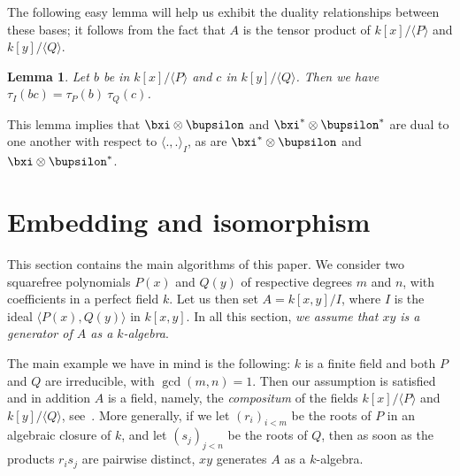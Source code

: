 \documentclass{sig-alternate}
\newcounter{algo}
\newcommand{\ang}[1]{\langle#1\rangle}
\newtheorem{Lemma}{Lemma}
\begin{document}
The following easy lemma will help us exhibit the duality
relationships between these bases; it follows from the fact that $A$
is the tensor product of $k[x]/\ang{P}$ and $k[y]/\ang{Q}$.
\begin{Lemma}
  \label{lemma:traces:PQR1}
  Let $b$ be in $k[x]/\ang{P}$ and $c$ in $k[y]/\ang{Q}$. Then we have
  $\tau_I(bc) = \tau_P(b) \ \tau_Q(c)$.
\end{Lemma}
This lemma implies that $\bxi \otimes \bupsilon$ and $\bxi^\ast
\otimes \bupsilon^\ast$ are dual to one another with respect to
$\ang{.,.}_I$, as are $\bxi^\ast \otimes \bupsilon$ and $\bxi
\otimes \bupsilon^\ast$. 


\section{Embedding and isomorphism} \label{sec:emb-iso}

This section contains the main algorithms of this paper. We consider
two squarefree polynomials $P(x)$ and $Q(y)$ of respective degrees $m$
and $n$, with coefficients in a perfect field $k$. Let us then set
$A=k[x,y]/I$, where $I$ is the ideal $\ang{P(x),Q(y)}$ in $k[x,y]$. In
all this section, {\em we assume that $xy$ is a generator of $A$ as a
  $k$-algebra}. 

The main example we have in mind is the following: $k$ is a finite
field and both $P$ and $Q$ are irreducible, with $\gcd(m,n)=1$. Then
our assumption is satisfied and in addition $A$ is a field, namely,
the {\em compositum} of the fields $k[x]/\ang{P}$ and $k[y]/\ang{Q}$,
see~\cite{BrCa87}. More generally, if we let $(r_i)_{i<m}$ be the
roots of $P$ in an algebraic closure of $k$, and let $(s_j)_{j<n}$ be
the roots of $Q$, then as soon as the products $r_i s_j$ are pairwise
distinct, $xy$ generates $A$ as a $k$-algebra.
\end{document}
